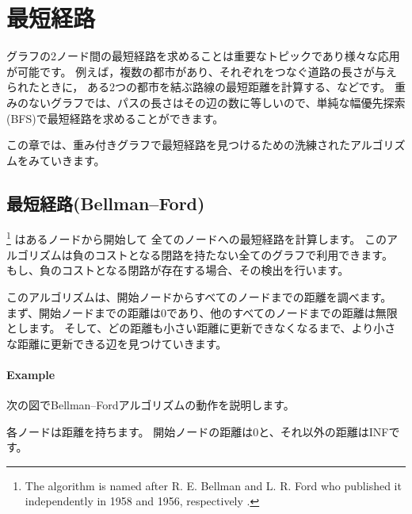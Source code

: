\chapter{最短経路}


グラフの2ノード間の最短経路を求めることは重要なトピックであり様々な応用が可能です。
例えば，複数の都市があり、それぞれをつなぐ道路の長さが与えられたときに，
ある2つの都市を結ぶ路線の最短距離を計算する、などです。
重みのないグラフでは、パスの長さはその辺の数に等しいので、単純な幅優先探索(BFS)で最短経路を求めることができます。

この章では、重み付きグラフで最短経路を見つけるための洗練されたアルゴリズムをみていきます。

\section{最短経路(Bellman–Ford)}


\footnote{The algorithm is named after
R. E. Bellman and L. R. Ford who published it independently
in 1958 and 1956, respectively \cite{bel58,for56a}.} はあるノードから開始して
全てのノードへの最短経路を計算します。
このアルゴリズムは負のコストとなる閉路を持たない全てのグラフで利用できます。
もし、負のコストとなる閉路が存在する場合、その検出を行います。

このアルゴリズムは、開始ノードからすべてのノードまでの距離を調べます。
まず、開始ノードまでの距離は0であり、他のすべてのノードまでの距離は無限とします。
そして、どの距離も小さい距離に更新できなくなるまで、より小さな距離に更新できる辺を見つけていきます。

\subsubsection{Example}

次の図でBellman–Fordアルゴリズムの動作を説明します。
\begin{center}
\end{center}
各ノードは距離を持ちます。
開始ノードの距離は0と、それ以外の距離はINFです。

